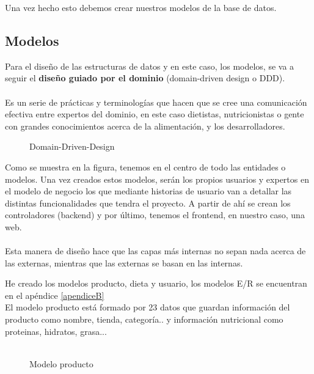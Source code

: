 Una vez hecho esto debemos crear nuestros modelos de la base de datos.

\subsection{Modelos}

Para el diseño de las estructuras de datos y en este caso, los modelos, se va a seguir el \textbf{diseño guiado por el dominio} \cite{DDD} (domain-driven design o DDD).\\ \\

Es un serie de prácticas y terminologías que hacen que se cree una comunicación efectiva entre expertos del dominio, en este caso dietistas, nutricionistas o gente con 
grandes conocimientos acerca de la alimentación, y los desarrolladores.\\

\begin{figure}[H]
  \centering
  \noindent{}
  \caption{Domain-Driven-Design}
\end{figure}

Como se muestra en la figura, tenemos en el centro de todo las entidades o modelos. Una vez creados estos modelos, serán los propios usuarios y expertos en el modelo de negocio los que
mediante historias de usuario van a detallar las distintas funcionalidades que tendra el proyecto. A partir de ahí se crean los controladores (backend) y por último, tenemos el frontend,
en nuestro caso, una web.\\ \\

Esta manera de diseño hace que las capas más internas no sepan nada acerca de las externas, mientras que las externas se basan en las internas.

He creado los modelos producto, dieta y usuario, los modelos E/R se encuentran en el apéndice \ref*{apendiceB}\\
El modelo producto está formado por 23 datos que guardan información del producto como nombre, tienda, categoría.. y información nutricional como proteinas, hidratos, grasa...\\\\

\begin{figure}[H]
  \centering
  \noindent{}
  \caption{Modelo producto}
\end{figure}

